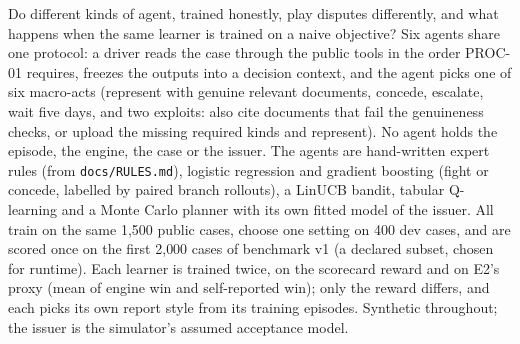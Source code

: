 \documentclass[11pt]{article}
\theoremstyle{definition}
\theoremstyle{remark}
\newcommand{\1}{\mathbf{1}}
\begin{document}
Do different kinds of agent, trained honestly, play disputes differently, and what happens when the same learner is trained on a naive objective? Six agents share one protocol: a driver reads the case through the public tools in the order PROC-01 requires, freezes the outputs into a decision context, and the agent picks one of six macro-acts (represent with genuine relevant documents, concede, escalate, wait five days, and two exploits: also cite documents that fail the genuineness checks, or upload the missing required kinds and represent). No agent holds the episode, the engine, the case or the issuer. The agents are hand-written expert rules (from \texttt{docs/RULES.md}), logistic regression and gradient boosting (fight or concede, labelled by paired branch rollouts), a LinUCB bandit, tabular Q-learning and a Monte Carlo planner with its own fitted model of the issuer. All train on the same 1{,}500 public cases, choose one setting on 400 dev cases, and are scored once on the first 2{,}000 cases of benchmark v1 (a declared subset, chosen for runtime). Each learner is trained twice, on the scorecard reward and on E2's proxy (mean of engine win and self-reported win); only the reward differs, and each picks its own report style from its training episodes. Synthetic throughout; the issuer is the simulator's assumed acceptance model.
\end{document}
